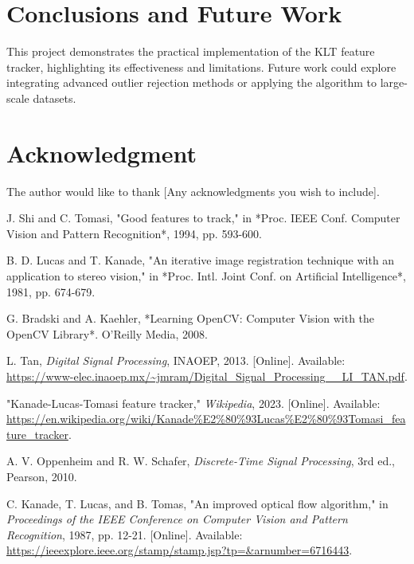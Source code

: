 \documentclass[11pt, conference, letterpaper]{IEEEtran}
\begin{document}
\section{Conclusions and Future Work}
This project demonstrates the practical implementation of the KLT feature tracker, highlighting its effectiveness and limitations. Future work could explore integrating advanced outlier rejection methods or applying the algorithm to large-scale datasets.

\section*{Acknowledgment}
The author would like to thank [Any acknowledgments you wish to include].

\begin{thebibliography}{1}

    J. Shi and C. Tomasi, "Good features to track," in *Proc. IEEE Conf. Computer Vision and Pattern Recognition*, 1994, pp. 593-600.
    
    B. D. Lucas and T. Kanade, "An iterative image registration technique with an application to stereo vision," in *Proc. Intl. Joint Conf. on Artificial Intelligence*, 1981, pp. 674-679.
    
    G. Bradski and A. Kaehler, *Learning OpenCV: Computer Vision with the OpenCV Library*. O'Reilly Media, 2008.
    
    L. Tan, \textit{Digital Signal Processing}, INAOEP, 2013. [Online]. Available: \url{https://www-elec.inaoep.mx/~jmram/Digital_Signal_Processing__LI_TAN.pdf}.
    
    "Kanade-Lucas-Tomasi feature tracker," \textit{Wikipedia}, 2023. [Online]. Available: \url{https://en.wikipedia.org/wiki/Kanade%E2%80%93Lucas%E2%80%93Tomasi_feature_tracker}.
    
    A. V. Oppenheim and R. W. Schafer, \textit{Discrete-Time Signal Processing}, 3rd ed., Pearson, 2010.
    
    C. Kanade, T. Lucas, and B. Tomas, "An improved optical flow algorithm," in \textit{Proceedings of the IEEE Conference on Computer Vision and Pattern Recognition}, 1987, pp. 12-21. [Online]. Available: \url{https://ieeexplore.ieee.org/stamp/stamp.jsp?tp=&arnumber=6716443}.
    
\end{thebibliography}
\end{document}
